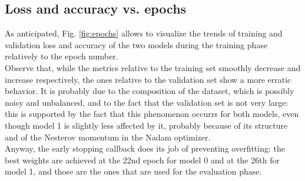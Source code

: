 \subsection{Loss and accuracy vs. epochs}

As anticipated, Fig. \ref{fig:epochs} allows to visualize the trends of training and validation loss and accuracy of the two models during the training phase relatively to the epoch number. 
\\ Observe that, while the metrics relative to the training set smoothly decrease and increase respectively, the ones relative to the validation set show a more erratic behavior. It is probably due to the composition of the dataset, which is possibly noisy and unbalanced, and to the fact that the validation set is not very large: this is supported by the fact that this phenomenon occurrs for both models, even though model 1 is slightly less affected by it, probably because of its structure and of the Nesterov momentum in the Nadam optimizer.
\\Anyway, the early stopping callback does its job of preventing overfitting: the best weights are achieved at the 22nd epoch for model 0 and at the 26th for model 1, and those are the ones that are used for the evaluation phase.

